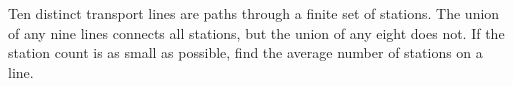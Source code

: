 Ten distinct transport lines are paths through a finite set of stations. The union of any nine lines connects all stations, but the union of any eight does not. If the station count is as small as possible, find the average number of stations on a line.
